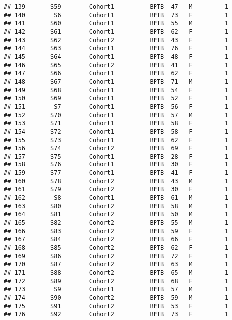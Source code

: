 \documentclass[
]{article}
\begin{document}
\begin{verbatim}
## 139       S59        Cohort1          BPTB  47   M         1      
## 140        S6        Cohort1          BPTB  73   F         1      
## 141       S60        Cohort1          BPTB  55   M         1      
## 142       S61        Cohort1          BPTB  62   F         1      
## 143       S62        Cohort2          BPTB  43   F         1      
## 144       S63        Cohort1          BPTB  76   F         1      
## 145       S64        Cohort1          BPTB  48   F         1      
## 146       S65        Cohort2          BPTB  41   F         1      
## 147       S66        Cohort1          BPTB  62   F         1      
## 148       S67        Cohort1          BPTB  71   M         1      
## 149       S68        Cohort1          BPTB  54   F         1      
## 150       S69        Cohort1          BPTB  52   F         1      
## 151        S7        Cohort1          BPTB  56   F         1      
## 152       S70        Cohort1          BPTB  57   M         1      
## 153       S71        Cohort1          BPTB  58   F         1      
## 154       S72        Cohort1          BPTB  58   F         1      
## 155       S73        Cohort1          BPTB  62   F         1      
## 156       S74        Cohort2          BPTB  69   F         1      
## 157       S75        Cohort1          BPTB  28   F         1      
## 158       S76        Cohort1          BPTB  30   F         1      
## 159       S77        Cohort1          BPTB  41   F         1      
## 160       S78        Cohort2          BPTB  43   M         1      
## 161       S79        Cohort2          BPTB  30   F         1      
## 162        S8        Cohort1          BPTB  61   M         1      
## 163       S80        Cohort2          BPTB  58   M         1      
## 164       S81        Cohort2          BPTB  50   M         1      
## 165       S82        Cohort2          BPTB  55   M         1      
## 166       S83        Cohort2          BPTB  59   F         1      
## 167       S84        Cohort2          BPTB  66   F         1      
## 168       S85        Cohort2          BPTB  62   F         1      
## 169       S86        Cohort2          BPTB  72   F         1      
## 170       S87        Cohort2          BPTB  63   M         1      
## 171       S88        Cohort2          BPTB  65   M         1      
## 172       S89        Cohort2          BPTB  68   F         1      
## 173        S9        Cohort1          BPTB  57   M         1      
## 174       S90        Cohort2          BPTB  59   M         1      
## 175       S91        Cohort2          BPTB  53   F         1      
## 176       S92        Cohort2          BPTB  73   F         1      

\end{verbatim}
\end{document}
